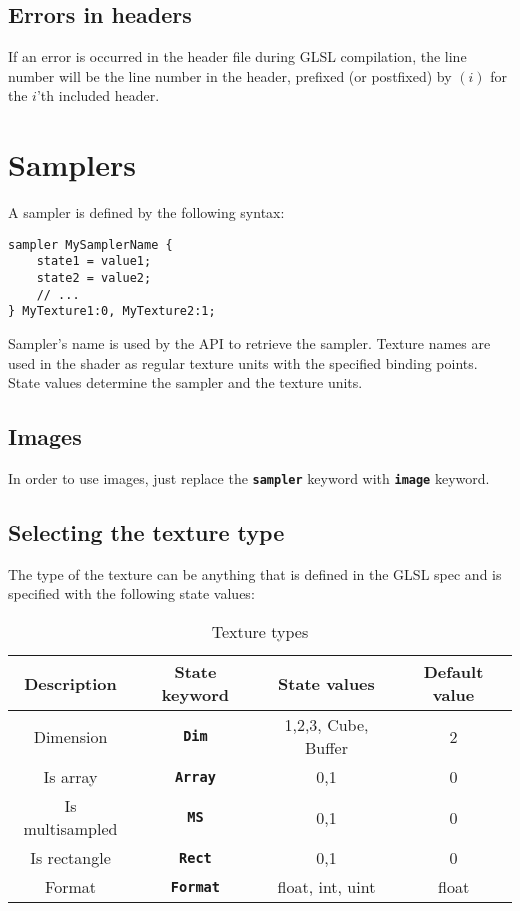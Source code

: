 \documentclass[11pt,a4paper,final,titlepage]{article}
\begin{document}
\subsection{Errors in headers}
If an error is occurred in the header file during GLSL compilation, the line number
will be the line number in the header, prefixed (or postfixed) by $(i)$ for the $i$'th
included header.

\pagebreak
\section{Samplers}\label{sec:samplers}

A sampler is defined by the following syntax:
\begin{lstlisting}
sampler MySamplerName {
	state1 = value1;
	state2 = value2;
	// ...
} MyTexture1:0, MyTexture2:1;
\end{lstlisting}
Sampler's name is used by the API to retrieve the sampler. Texture names are used in the shader
as regular texture units with the specified binding points.
State values determine the sampler and the texture units.

\subsection{Images}
In order to use images, just replace the \texttt{\textbf{sampler}} keyword with \texttt{\textbf{image}}
keyword.

\subsection{Selecting the texture type}
The type of the texture can be anything that is defined in the GLSL spec and is specified with
the following state values:
\begin{table}[h]
\centering
\begin{tabular}{|c|c|c|c|}
\hline
Description & State keyword & State values & Default value\\
\hline\hline
Dimension & \texttt{\textbf{Dim}} & 1,2,3, Cube, Buffer & 2\\
\hline
Is array & \texttt{\textbf{Array}} & 0,1 & 0\\
\hline
Is multisampled & \texttt{\textbf{MS}} & 0,1 & 0\\
\hline
Is rectangle & \texttt{\textbf{Rect}} & 0,1 & 0\\
\hline
Format & \texttt{\textbf{Format}} & float, int, uint & float\\
\hline
\end{tabular}
\caption{Texture types}
\label{tab:texTypes}
\end{table}
\end{document}
